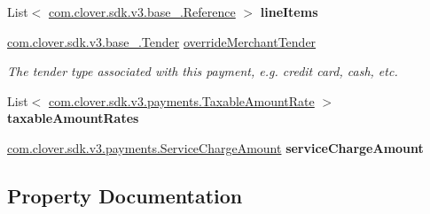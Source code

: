 \begin{DoxyCompactItemize}
\item 
\mbox{\label{classcom_1_1clover_1_1sdk_1_1v3_1_1payments_1_1_refund_a034dd15da6df5f1aef65e9665f65a02c}} 
List$<$ \hyperlink{classcom_1_1clover_1_1sdk_1_1v3_1_1base___1_1_reference}{com.\+clover.\+sdk.\+v3.\+base\+\_\+.\+Reference} $>$ {\bfseries line\+Items}
\item 
\hyperlink{classcom_1_1clover_1_1sdk_1_1v3_1_1base___1_1_tender}{com.\+clover.\+sdk.\+v3.\+base\+\_\+.\+Tender} \hyperlink{classcom_1_1clover_1_1sdk_1_1v3_1_1payments_1_1_refund_a42fd1ab2cec842286b312eb5ebfc8dc0}{override\+Merchant\+Tender}
\begin{DoxyCompactList}\small\item\em The tender type associated with this payment, e.\+g. credit card, cash, etc. \end{DoxyCompactList}\item 
\mbox{\label{classcom_1_1clover_1_1sdk_1_1v3_1_1payments_1_1_refund_a87c1d19cb80289ca323cf16eadb59865}} 
List$<$ \hyperlink{classcom_1_1clover_1_1sdk_1_1v3_1_1payments_1_1_taxable_amount_rate}{com.\+clover.\+sdk.\+v3.\+payments.\+Taxable\+Amount\+Rate} $>$ {\bfseries taxable\+Amount\+Rates}
\item 
\mbox{\label{classcom_1_1clover_1_1sdk_1_1v3_1_1payments_1_1_refund_a831aebe9b83f68263540f362f7bcda7e}} 
\hyperlink{classcom_1_1clover_1_1sdk_1_1v3_1_1payments_1_1_service_charge_amount}{com.\+clover.\+sdk.\+v3.\+payments.\+Service\+Charge\+Amount} {\bfseries service\+Charge\+Amount}
\end{DoxyCompactItemize}


\subsection{Property Documentation}
\mbox{\label{classcom_1_1clover_1_1sdk_1_1v3_1_1payments_1_1_refund_a34dd643d3722aee8578a5a85044bef18}} 
